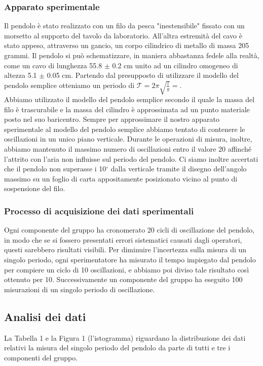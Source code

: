 \documentclass[12pt, twoside, a4paper]{article}
\begin{document}
		\subsubsection{Apparato sperimentale}
Il pendolo è stato realizzato con un filo da pesca "inestensibile" fissato con un morsetto al supporto del tavolo da laboratorio. All'altra estremità del cavo è stato appeso, attraverso un gancio, un corpo cilindrico di metallo di massa 205 grammi. Il pendolo si può schematizzare, in maniera abbastanza fedele alla realtà, come un cavo di lunghezza 55.8 $\pm$ 0.2 cm unito ad un cilindro omogeneo di altezza 5.1 $\pm$ 0.05 cm. Partendo dal presupposto di utilizzare il modello del pendolo semplice otteniamo un periodo di $\mathcal{T} = 2\pi \sqrt{\frac{l}{g}}= $.\\
Abbiamo utilizzato il modello del pendolo semplice secondo il quale la massa del filo è trascurabile e la massa del cilindro è approssimata ad un punto materiale posto nel suo baricentro. Sempre per approssimare il nostro apparato sperimentale al modello del pendolo semplice abbiamo tentato di contenere le oscillazioni in un unico piano verticale. Durante le operazioni di misura, inoltre, abbiamo mantenuto il massimo numero di oscillazioni entro il valore 20 affinché l'attrito con l'aria non influisse sul periodo del pendolo. Ci siamo inoltre accertati che il pendolo non superasse i 10$^\circ$ dalla verticale tramite il disegno dell'angolo massimo su un foglio di carta appositamente posizionato vicino al punto di sospensione del filo.
		\subsubsection{Processo di acquisizione dei dati sperimentali}
Ogni componente del gruppo ha cronomerato 20 cicli di oscillazione del pendolo, in modo che se si fossero presentati errori sistematici causati dagli operatori, questi sarebbero risultati visibili. Per diminuire l'incertezza sulla misura di un singolo periodo, ogni sperimentatore ha misurato il tempo impiegato dal pendolo per compiere un ciclo di 10 oscillazioni, e abbiamo poi diviso tale risultato così ottenuto per 10. Successivamente un componente del gruppo ha eseguito 100 misurazioni di un singolo periodo di oscillazione. 
	\subsection{Analisi dei dati}
La Tabella 1 e la Figura 1 (l'istogramma) riguardano la distribuzione dei dati relativi la misura del singolo periodo del pendolo da parte di tutti e tre i componenti del gruppo.\\
\end{document}
